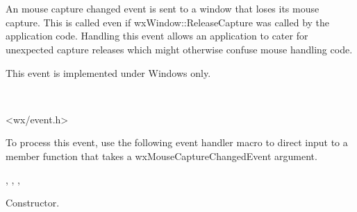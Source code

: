 \section{}\label{wxmousecapturechangedevent}

An mouse capture changed event is sent to a window that loses its
mouse capture. This is called even if wxWindow::ReleaseCapture
was called by the application code. Handling this event allows
an application to cater for unexpected capture releases which
might otherwise confuse mouse handling code.

This event is implemented under Windows only.


\\


<wx/event.h>


To process this event, use the following event handler macro to direct input to a member
function that takes a wxMouseCaptureChangedEvent argument.

\twocolwidtha{7cm}
\begin{twocollist}\itemsep=0pt
\end{twocollist}


, 
, 
, 


\label{wxmousecapturechangedeventctor}


Constructor.

\label{wxmousecapturechangedeventgetcapturedwindow}



